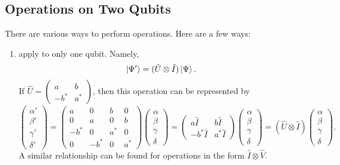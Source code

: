 \documentclass{article}
\numberwithin{equation}{section}
\begin{document}
\subsection{Operations on Two Qubits}
There are various ways to perform operations. Here are a few ways:
\begin{enumerate}
    \item {} apply to only one qubit. Namely,
    \begin{equation}
        \ket{\Psi'} = (\hat{U}\otimes \hat{I})\ket{\Psi}.
    \end{equation}
    If $\hat{U} = \begin{pmatrix}
        a & b  \\ -b^* & a^*
    \end{pmatrix}$, then this operation can be represented by 
    \begin{equation}
        \begin{pmatrix}
            \alpha' \\ \beta' \\ \gamma' \\ \delta'
        \end{pmatrix} = \begin{pmatrix}
            a & 0 & b & 0 \\
            0 & a & 0 & b \\ 
            -b^* & 0 & a^* & 0 \\ 
            0 & -b^* & 0 & a^*
        \end{pmatrix}\begin{pmatrix}
            \alpha \\ \beta \\ \gamma \\ \delta
        \end{pmatrix} = \begin{pmatrix}
            a\hat{I} & b\hat{I} \\ 
            -b^*\hat{I} & a^*\hat{I}
        \end{pmatrix}\begin{pmatrix}
            \alpha \\ \beta \\ \gamma \\ \delta
        \end{pmatrix} = (\hat{U} \otimes \hat{I})\begin{pmatrix}
            \alpha \\ \beta \\ \gamma \\ \delta
        \end{pmatrix}.
    \end{equation}
    A similar relationship can be found for operations in the form $\hat{I} \otimes \hat{V}.$
\end{enumerate}
\end{document}
